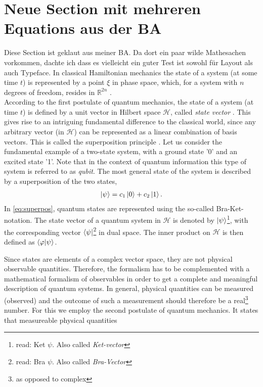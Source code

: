 \section{Neue Section mit mehreren Equations aus der BA}
Diese Section ist geklaut aus meiner BA. Da dort ein paar wilde Mathesachen
vorkommen, dachte ich dass es vielleicht ein guter Test ist sowohl für Layout
als auch Typeface.
In classical Hamiltonian mechanics the state of a system (at some time $t$) is
represented by a point $\xi$ in phase space, which, for a system with $n$
degrees of freedom, resides in $\mathbb{R}^{2n}$
\cite{noltingHamiltonMechanik2014}.\\
According to the first postulate of quantum mechanics, the state of a system
(at time $t$) is defined by a unit vector in Hilbert space $\mathcal{H}$,
called \emph{state vector} \cite{cohen-tannoudjiQuantumMechanicsVolume1977}.
This gives rise to an
intriguing fundamental difference to the classical world, since any arbitrary
vector (in $\mathcal{H}$) can be represented as a linear combination of basis
vectors.  This is called the superposition principle
\cite{poschelFourierreihen2015, messiahQuantumMechanics1991}.
Let us consider the fundamental example of a two-state system, with a ground state '0' and an excited state '1'.
Note that in the context of quantum information this type of system is referred to as \emph{qubit}.
The most general state of the system is described by a superposition of the two states,  
\begin{align}\label{eq:superpos}
    \ket{\psi} = c_1 \ket{0} + c_2 \ket{1}.
\end{align}
In \cref{eq:superpos}, quantum states are represented using the so-called Bra-Ket-notation. 
The state vector of a quantum system in $\mathcal{H}$ is denoted by $\ket{\psi}$\footnote{read: Ket $\psi$. Also called \emph{Ket-vector}},
with the corresponding vector $\bra{\psi}$\footnote{read: Bra $\psi$. Also called \emph{Bra-Vector}} in dual space.
The inner product on $\mathcal{H}$ is then defined as
$\braket{\varphi}{\psi}$.
\par
Since states are elements of a complex vector space, they are not physical observable quantities. Therefore, the formalism
has to be complemented with a mathematical formalism of observables in order to get a complete and meaningful description of quantum systems.
In general, physical quantities can be measured (observed) and the outcome of such a measurement should therefore be
a real\footnote{as opposed to complex} number.
For this we employ the second postulate of quantum mechanics. It states that measureable physical quantities
